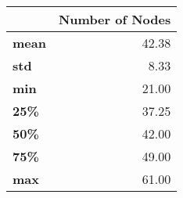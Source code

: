 \begin{tabular}{lr}
\toprule
{} &  Number of Nodes \\
\midrule
\textbf{mean} &            42.38 \\
\textbf{std } &             8.33 \\
\textbf{min } &            21.00 \\
\textbf{25\% } &            37.25 \\
\textbf{50\% } &            42.00 \\
\textbf{75\% } &            49.00 \\
\textbf{max } &            61.00 \\
\bottomrule
\end{tabular}

